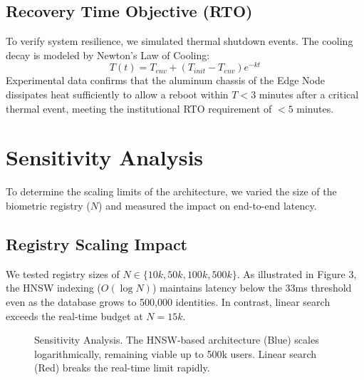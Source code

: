 \documentclass[conference]{IEEEtran}
\begin{document}
\subsection{Recovery Time Objective (RTO)}
To verify system resilience, we simulated thermal shutdown events. The cooling decay is modeled by Newton's Law of Cooling:
\begin{equation}
T(t) = T_{env} + (T_{init} - T_{env}) e^{-kt}
\end{equation}
Experimental data confirms that the aluminum chassis of the Edge Node dissipates heat sufficiently to allow a reboot within $T < 3$ minutes after a critical thermal event, meeting the institutional RTO requirement of $<5$ minutes.

\section{Sensitivity Analysis}
To determine the scaling limits of the architecture, we varied the size of the biometric registry ($N$) and measured the impact on end-to-end latency.

\subsection{Registry Scaling Impact}
We tested registry sizes of $N \in \{10k, 50k, 100k, 500k\}$.
As illustrated in Figure 3, the HNSW indexing ($O(\log N)$) maintains latency below the 33ms threshold even as the database grows to 500,000 identities. In contrast, linear search exceeds the real-time budget at $N=15k$.

\begin{figure}[htbp]
\centering
{}
\caption{Sensitivity Analysis. The HNSW-based architecture (Blue) scales logarithmically, remaining viable up to 500k users. Linear search (Red) breaks the real-time limit rapidly.}
\label{fig:scaling}
\end{figure}
\end{document}

